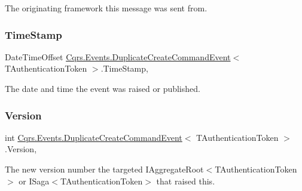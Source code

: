 The originating framework this message was sent from. 

\mbox{\label{classCqrs_1_1Events_1_1DuplicateCreateCommandEvent_ae732d7442d4eed8329e39a500433c96c_ae732d7442d4eed8329e39a500433c96c}} 
\subsubsection{\texorpdfstring{Time\+Stamp}{TimeStamp}}
{\footnotesize\ttfamily Date\+Time\+Offset \hyperlink{classCqrs_1_1Events_1_1DuplicateCreateCommandEvent}{Cqrs.\+Events.\+Duplicate\+Create\+Command\+Event}$<$ T\+Authentication\+Token $>$.Time\+Stamp\hspace{0.3cm}{\ttfamily [get]}, {\ttfamily [set]}}



The date and time the event was raised or published. 

\mbox{\label{classCqrs_1_1Events_1_1DuplicateCreateCommandEvent_ad2d19f109697e676edf4ad7dc7b19bdd_ad2d19f109697e676edf4ad7dc7b19bdd}} 
\subsubsection{\texorpdfstring{Version}{Version}}
{\footnotesize\ttfamily int \hyperlink{classCqrs_1_1Events_1_1DuplicateCreateCommandEvent}{Cqrs.\+Events.\+Duplicate\+Create\+Command\+Event}$<$ T\+Authentication\+Token $>$.Version\hspace{0.3cm}{\ttfamily [get]}, {\ttfamily [set]}}



The new version number the targeted I\+Aggregate\+Root$<$\+T\+Authentication\+Token$>$ or I\+Saga$<$\+T\+Authentication\+Token$>$ that raised this. 

